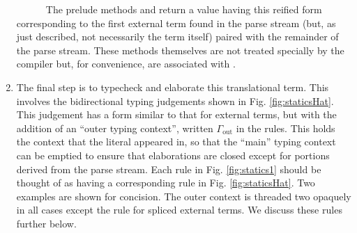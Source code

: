 \begin{enumerate}
~~~~~~The prelude methods  and  return a value having this reified form corresponding to the first external term found in the parse stream (but, as just described, not necessarily the term itself) paired with the remainder of the parse stream. These methods themselves are not treated specially by the compiler but, for convenience, are associated with  .
\item The final step is to typecheck and elaborate this translational term. This involves the bidirectional typing judgements shown in Fig. \ref{fig:staticsHat}. This judgement has a form similar to that for external terms, but with the addition of an ``outer typing context'', written $\Gamma_{\text{out}}$ in the rules. This holds the context that the literal appeared in, so that the ``main'' typing context can be emptied to ensure that elaborations are closed except for portions derived from the parse stream. 
Each rule in Fig. \ref{fig:statics1} should be thought of as having a corresponding rule in Fig. \ref{fig:staticsHat}. Two examples are shown for concision. The outer context is threaded two opaquely in all cases except the rule for spliced external terms. We discuss these rules further below.
\end{enumerate}


